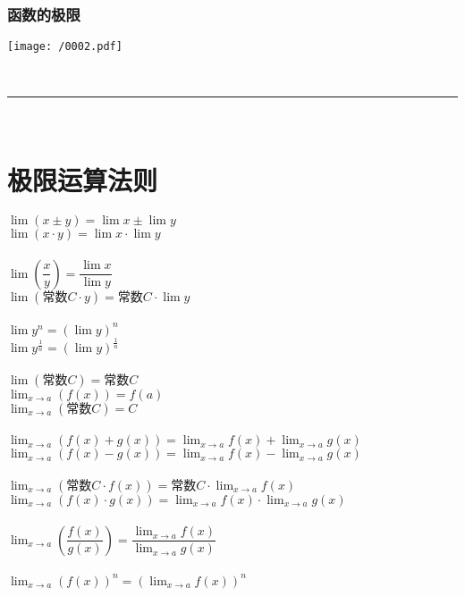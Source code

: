 \documentclass[UTF8]{ctexart}
\begin{document}
\section{函数的极限}

\texttt{[image: /0002.pdf]}

~\\
\hrule
~\\




\part{极限运算法则}

$ \lim (x \pm y) = \lim x \pm \lim y $ \\
$ \lim (x \cdot y) = \lim x \cdot \lim y $  \\
\\
$ \lim (\dfrac{x} {y}) = \dfrac{\lim x} {\lim y} $ \\
$ \lim (\text{常数} C \cdot y) = \text{常数} C \cdot \lim y $ \\
\\
$ \lim y^n = (\lim y)^n $ \\
$ \lim y^{\frac{1} {n}} = (\lim y)^{\frac{1} {n}} $ \\
\\
$ \lim(\text{常数}C) = \text{常数}C $
\\

$\lim_{x\rightarrow a}\left( f\left( x \right) \right) =f\left( a \right) $ \\
$\lim_{x\rightarrow a}\left( \text{常数}C \right) =C$ \\
\\
$ \lim_{x\rightarrow a}\left( f\left( x \right) +g\left( x \right) \right) =\lim_{x\rightarrow a}f\left( x \right) +\lim_{x\rightarrow a}g\left( x \right) $ \\
$\lim_{x\rightarrow a}\left( f\left( x \right) -g\left( x \right) \right) =\lim_{x\rightarrow a}f\left( x \right) -\lim_{x\rightarrow a}g\left( x \right) $ \\
\\
$\lim_{x\rightarrow a}\left( \text{常数}C\cdot f\left( x \right) \right) =\text{常数}C\cdot \lim_{x\rightarrow a}f\left( x \right) $ \\
$\lim_{x\rightarrow a}\left( f\left( x \right) \cdot g\left( x \right) \right) =\lim_{x\rightarrow a}f\left( x \right) \cdot \lim_{x\rightarrow a}g\left( x \right) $ \\
\\
$\lim_{x\rightarrow a}\left( \dfrac{f\left( x \right)}{g\left( x \right)} \right) =\dfrac{\lim_{x\rightarrow a}f\left( x \right)}{\lim_{x\rightarrow a}g\left( x \right)}$ \\
\\
$\lim_{x\rightarrow a}\left( f\left( x \right) \right) ^n=\left( \lim_{x\rightarrow a}f\left( x \right) \right) ^n$ 
\end{document}

